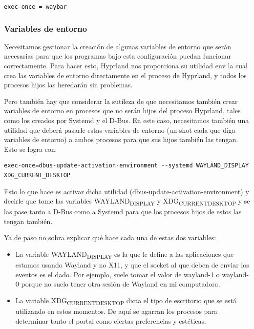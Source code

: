 \documentclass[11pt]{article}
\begin{document}
\begin{verbatim}
exec-once = waybar
\end{verbatim}
\subsubsection{Variables de entorno}
\label{sec:org0432b32}

Necesitamos gestionar la creación de algunas variables de entorno que serán necesarias para que los programas bajo esta configuración puedan funcionar correctamente. Para hacer esto, Hyprland nos proporciona su utilidad env la cual crea las variables de entorno directamente en el proceso de Hyprland, y todos los procesos hijos las heredarán sin problemas.

Pero también hay que considerar la sutileza de que necesitamos también crear variables de entorno en procesos que no serán hijos del proceso Hyprland, tales como los creados por Systemd y el D-Bus. En este caso, necesitamos también una utilidad que deberá pasarle estas variables de entorno (un shot cada que diga variables de entorno) a ambos procesos para que sus hijos también las tengan. Esto se logra con:

\begin{verbatim}
exec-once=dbus-update-activation-environment --systemd WAYLAND_DISPLAY XDG_CURRENT_DESKTOP
\end{verbatim}

Esto lo que hace es activar dicha utilidad (dbus-update-activation-environment) y decirle que tome las variables WAYLAND\textsubscript{DISPLAY} y XDG\textsubscript{CURRENT}\textsubscript{DESKTOP} y se las pase tanto a D-Bus como a Systemd para que los procesos hijos de estos las tengan también.

Ya de paso no sobra explicar qué hace cada una de estas dos variables:

\begin{itemize}
\item La variable WAYLAND\textsubscript{DISPLAY} es la que le define a las aplicaciones que estamos usando Wayland y no X11, y que el socket al que deben de enviar los eventos es el dado. Por ejemplo, suele tomar el valor de wayland-1 o wayland-0 porque no suelo tener otra sesión de Wayland en mi computadora.
\item La variable XDG\textsubscript{CURRENT}\textsubscript{DESKTOP} dicta el tipo de escritorio que se está utilizando en estos momentos. De aquí se agarran los procesos para determinar tanto el portal como ciertas preferencias y estéticas.
\end{itemize}
\end{document}
